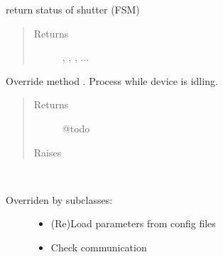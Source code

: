\documentclass[letterpaper,10pt,english]{sphinxmanual}
\begin{document}
\begin{fulllineitems}

\begin{fulllineitems}
\label{enuActor.Devices:enuActor.Devices.Device.Device.getStatus}
return status of shutter (FSM)
\begin{quote}\begin{description}
\item[{Returns}] \leavevmode
{}, , , ...

\end{description}\end{quote}

\end{fulllineitems}


\begin{fulllineitems}
\label{enuActor.Devices:enuActor.Devices.Device.Device.handleTimeout}
Override method {\hyperref[enuActor:enuActor.QThread.QThread.handleTimeout]{}}.
Process while device is idling.
\begin{quote}\begin{description}
\item[{Returns}] \leavevmode
@todo

\item[{Raises}] \leavevmode
{\hyperref[enuActor.Devices:enuActor.Devices.Error.CommErr]{}}

\end{description}\end{quote}

\end{fulllineitems}


\begin{fulllineitems}
\label{enuActor.Devices:enuActor.Devices.Device.Device.initialise}~\begin{description}
\item[{Overriden by subclasses:}] \leavevmode\begin{itemize}
\item {} 
(Re)Load parameters from config files

\item {} 
Check communication


\end{itemize}
\end{description}
\end{fulllineitems}
\end{fulllineitems}
\end{document}

